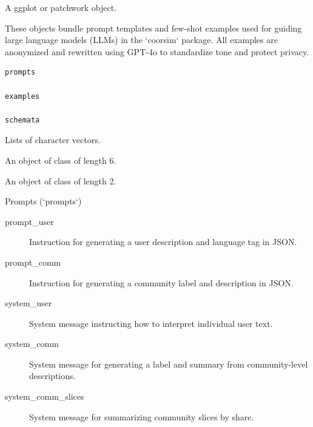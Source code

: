 \documentclass[a4paper]{book}
\begin{document}
%
\begin{Value}
A ggplot or patchwork object.
\end{Value}
%
\begin{Description}
These objects bundle prompt templates and few-shot examples used for guiding large language models (LLMs) in the `coorsim` package.
All examples are anonymized and rewritten using GPT-4o to standardize tone and protect privacy.
\end{Description}
%
\begin{Usage}
\begin{verbatim}
prompts

examples

schemata
\end{verbatim}
\end{Usage}
%
\begin{Format}
Lists of character vectors.

An object of class  of length 6.

An object of class  of length 2.
\end{Format}
%
\begin{Section}{Prompts (`prompts`)}

\begin{description}

\item[prompt\_user] Instruction for generating a user description and language tag in JSON.
\item[prompt\_comm] Instruction for generating a community label and description in JSON.
\item[system\_user] System message instructing how to interpret individual user text.
\item[system\_comm] System message for generating a label and summary from community-level descriptions.
\item[system\_comm\_slices] System message for summarizing community slices by share.

\end{description}

\end{Section}
%
\end{document}
